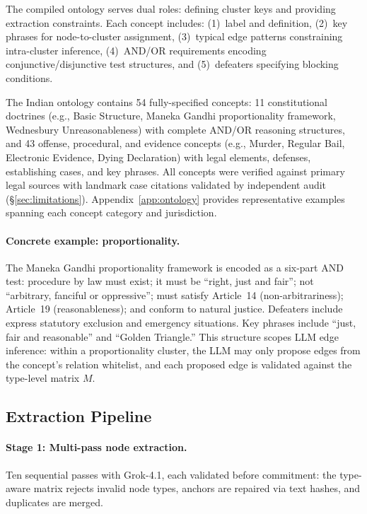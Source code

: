 \documentclass[11pt]{article}
\begin{document}
The compiled ontology serves dual roles: defining cluster keys and providing extraction constraints. Each concept includes: (1)~label and definition, (2)~key phrases for node-to-cluster assignment, (3)~typical edge patterns constraining intra-cluster inference, (4)~AND/OR requirements encoding conjunctive/disjunctive test structures, and (5)~defeaters specifying blocking conditions.

The Indian ontology contains 54 fully-specified concepts: 11 constitutional doctrines (e.g., Basic Structure, Maneka Gandhi proportionality framework, Wednesbury Unreasonableness) with complete AND/OR reasoning structures, and 43 offense, procedural, and evidence concepts (e.g., Murder, Regular Bail, Electronic Evidence, Dying Declaration) with legal elements, defenses, establishing cases, and key phrases. All concepts were verified against primary legal sources with landmark case citations validated by independent audit (\S\ref{sec:limitations}). Appendix~\ref{app:ontology} provides representative examples spanning each concept category and jurisdiction.

\paragraph{Concrete example: proportionality.}
The Maneka Gandhi proportionality framework is encoded as a six-part AND test: procedure by law must exist; it must be ``right, just and fair''; not ``arbitrary, fanciful or oppressive''; must satisfy Article~14 (non-arbitrariness); Article~19 (reasonableness); and conform to natural justice. Defeaters include express statutory exclusion and emergency situations. Key phrases include ``just, fair and reasonable'' and ``Golden Triangle.'' This structure scopes LLM edge inference: within a proportionality cluster, the LLM may only propose edges from the concept's relation whitelist, and each proposed edge is validated against the type-level matrix $M$.

\subsection{Extraction Pipeline}
\label{sec:pipeline}

\paragraph{Stage 1: Multi-pass node extraction.}
Ten sequential passes with Grok-4.1, each validated before commitment: the type-aware matrix rejects invalid node types, anchors are repaired via text hashes, and duplicates are merged.
\end{document}

